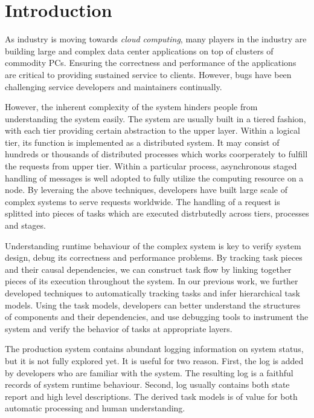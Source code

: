 
\section{Introduction}
\label{sec:intro}

As industry is moving towards \textit{cloud computing}, many
players in the industry are building large and complex data
center applications on top of clusters of commodity PCs.
Ensuring the correctness and performance of the applications
are critical to providing sustained service to clients.
However, bugs have been challenging service developers and
maintainers continually.

However, the inherent complexity of the system hinders
people from understanding the system easily. The system are
usually built in a tiered fashion, with each tier providing
certain abstraction to the upper layer. Within a logical
tier, its function is implemented as a distributed system.
It may consist of hundreds or thousands of distributed
processes which works coorperately to fulfill the requests
from upper tier. Within a particular process, asynchronous
staged handling of messages is well adopted to fully utilize
the computing resource on a node. By leveraing the above
techniques, developers have built large scale of complex
systems to serve requests worldwide. The handling of a
request is splitted into pieces of tasks which are executed
distrbutedly across tiers, processes and stages. 

Understanding runtime behaviour of the complex system is key
to verify system design, debug its correctness and
performance problems. By tracking task pieces and their
causal dependencies, we can construct task flow by linking
together pieces of its execution throughout the system.  In
our previous work, we further developed techniques to
automatically tracking tasks and infer hierarchical task
models. Using the task models, developers can better
understand the structures of components and their
dependencies, and use debugging tools to instrument the
system and verify the behavior of tasks at appropriate
layers.

The production system contains abundant logging information
on system status, but it is not fully explored yet. It is
useful for two reason. First, the log is added by developers
who are familiar with the system.  The resulting log is a
faithful records of system runtime behaviour. Second, log
usually contains both state report and high level
descriptions. The derived task models is of value for both
automatic processing and human understanding.


